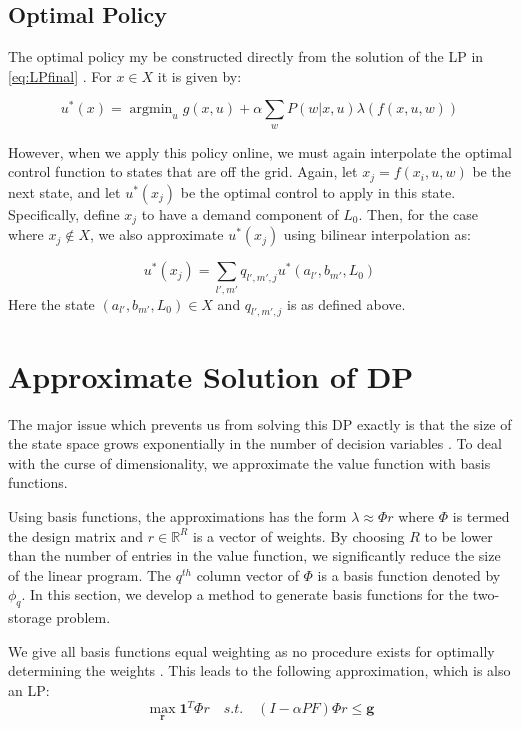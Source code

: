 \documentclass[conference]{IEEEtran}
\DeclareMathOperator*{\argmin}{argmin}
\begin{document}
\subsection{Optimal Policy}
The optimal policy my be constructed directly from the solution of the LP in \eqref{eq:LPfinal} \cite{Bertsekas:2007:DPO:1396348}. For $x\in X$ it is given by:

\begin{equation}
    u^{*}(x)=\argmin_{u} g(x,u)+\alpha \sum_{w} P(w|x,u)\lambda(f(x,u,w))
\end{equation}

However, when we apply this policy online, we must again interpolate the optimal control function to states that are off the grid. Again, let $x_{j}=f(x_{i}, u, w)$ be the next state, and let $u^{*}(x_{j})$ be the optimal control to apply in this state. Specifically, define $x_{j}$ to have a demand component of $L_{0}$. Then, for the case where $x_{j}\not\in X$, we also approximate $u^{*}(x_{j})$ using bilinear interpolation as:

\begin{equation}
    u^{*}(x_{j})=\sum_{l',m'}q_{l',m',j}u^{*}(a_{l'},b_{m'},L_{0})
\end{equation} Here the state $(a_{l'},b_{m'},L_{0})\in X$ and $q_{l',m',j}$ is as defined above.


\section{Approximate Solution of DP}
The major issue which prevents us from solving this DP exactly is that the size of the state space grows exponentially in the number of decision variables \cite{deFarias:2003:LPA:970869.970918}. To deal with the curse of dimensionality, we approximate the value function with basis functions.

Using basis functions, the approximations has the form $\lambda\approx \Phi r$ where $\Phi$ is termed the design matrix and $r\in \mathbb{R}^R$ is a vector of weights. By choosing $R$ to be lower than the number of entries in the value function, we significantly reduce the size of the linear program. The $q^{th}$ column vector of $\Phi$ is a basis function denoted by $\phi_{q}$. In this section, we develop a method to generate basis functions for the two-storage problem.

We give all basis functions equal weighting as no procedure exists for optimally determining the weights \cite{deFarias:2003:LPA:970869.970918, PatrascuReluEugen2004}. This leads to the following approximation, which is also an LP:
\begin{equation} \label{eq:ApproxLP}
    \max_{\boldsymbol{r}} \boldsymbol{1}^{T} \Phi r
    \hspace{1em}s.t.\hspace{1em}
    (I-\alpha PF)\Phi r \leq \boldsymbol{g}
\end{equation}
\end{document}
